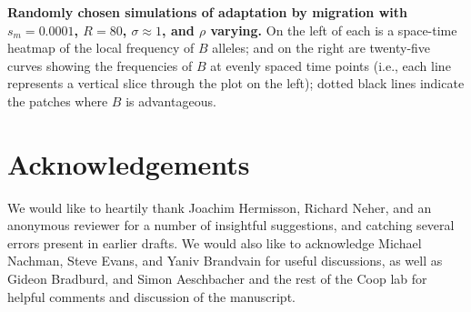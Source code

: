 \documentclass[10pt,letterpaper]{article}
\begin{document}
\textbf{Randomly chosen simulations of adaptation by migration
with $s_m=0.0001$, $R=80$, $\sigma\approx 1$, and $\rho$ varying.}
    On the left of each is a space-time heatmap of the local frequency of $B$ alleles;
    and on the right are twenty-five curves showing the frequencies of $B$ at evenly spaced time points
    (i.e., each line represents a vertical slice through the plot on the left);
    dotted black lines indicate the patches where $B$ is advantageous.


\section*{Acknowledgements}
We would like to heartily thank Joachim Hermisson, Richard Neher, and an anonymous reviewer
for a number of insightful suggestions,
and catching several errors present in earlier drafts. 
We would also like to acknowledge Michael Nachman, Steve Evans, and Yaniv Brandvain for useful discussions, 
as well as Gideon Bradburd, and Simon Aeschbacher and the rest of the Coop lab
for helpful comments and discussion of the manuscript.

\nolinenumbers
\end{document}
